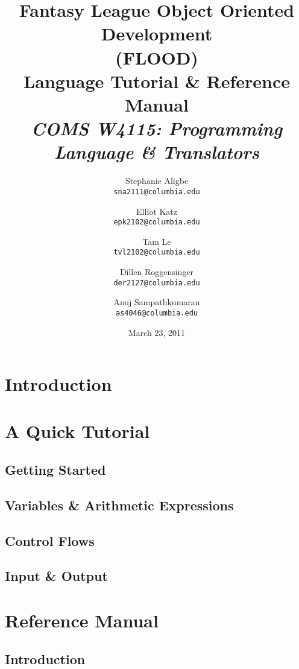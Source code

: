 \documentclass[12pt]{report}
\begin{document}
\title{
\textbf{Fantasy League Object Oriented Development}\\
\textbf{(FLOOD)}\\
\LARGE{Language Tutorial \& Reference Manual}\\
{\normalsize \textit{COMS W4115: Programming Language \& Translators}}\\
}
\author{
  Stephanie Aligbe\\
  \texttt{\small{sna2111@columbia.edu}}
  \and
  Elliot Katz\\
  \texttt{\small{epk2102@columbia.edu}}
  \and
  Tam Le\\
  \texttt{\small{tvl2102@columbia.edu}}
  \and
  Dillen Roggensinger\\
  \texttt{\small{der2127@columbia.edu}}
  \and
  Anuj Sampathkumaran\\
  \texttt{\small{as4046@columbia.edu}}
}
\date{March 23, 2011}
\maketitle
\tableofcontents

\chapter{Introduction}

\chapter{A Quick Tutorial}
\section{Getting Started}
\section{Variables \& Arithmetic Expressions}
\section{Control Flows}
\section{Input \& Output}

\chapter{Reference Manual}
\section{Introduction}
\end{document}
